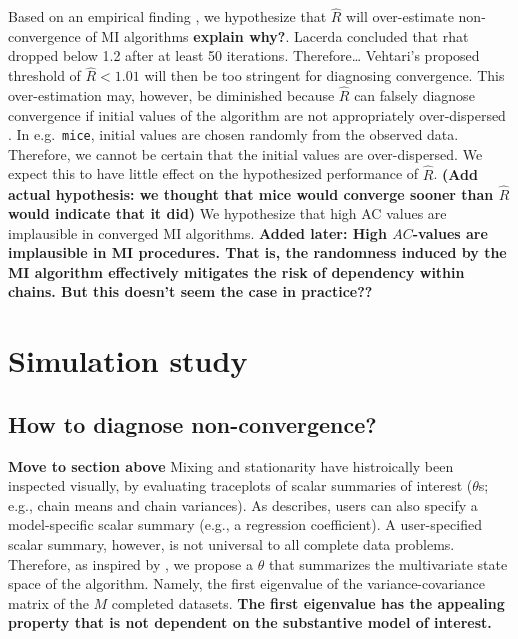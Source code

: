 \documentclass[Royal,times,sageh]{sagej}
\begin{document}
Based on an empirical finding \citep{lace07}, we hypothesize that
\(\widehat{R}\) will over-estimate non-convergence of MI algorithms
\textbf{explain why?}. Lacerda concluded that rhat dropped below 1.2
after at least 50 iterations. Therefore\ldots{} Vehtari's proposed
threshold of \(\widehat{R} < 1.01\) will then be too stringent for
diagnosing convergence. This over-estimation may, however, be diminished
because \(\widehat{R}\) can falsely diagnose convergence if initial
values of the algorithm are not appropriately over-dispersed
\citep[p.~437]{broo98}. In e.g.~\texttt{mice}, initial values are chosen
randomly from the observed data. Therefore, we cannot be certain that
the initial values are over-dispersed. We expect this to have little
effect on the hypothesized performance of \(\widehat{R}\). \textbf{(Add
actual hypothesis: we thought that mice would converge sooner than
\(\widehat{R}\) would indicate that it did)} We hypothesize that high AC
values are implausible in converged MI algorithms. \textbf{Added later:
High \(AC\)-values are implausible in MI procedures. That is, the
randomness induced by the MI algorithm effectively mitigates the risk of
dependency within chains. But this doesn't seem the case in practice??}

\hypertarget{simulation-study}{%
\section{Simulation study}\label{simulation-study}}

\hypertarget{how-to-diagnose-non-convergence}{%
\subsection{How to diagnose
non-convergence?}\label{how-to-diagnose-non-convergence}}

\textbf{Move to section above} Mixing and stationarity have histroically
been inspected visually, by evaluating traceplots of scalar summaries of
interest (\(\theta\)s; e.g., chain means and chain variances). As
\citet{buur18} describes, users can also specify a model-specific scalar
summary (e.g., a regression coefficient). A user-specified scalar
summary, however, is not universal to all complete data problems.
Therefore, as inspired by \citep{mack03}, we propose a \(\theta\) that
summarizes the multivariate state space of the algorithm. Namely, the
first eigenvalue of the variance-covariance matrix of the \(M\)
completed datasets. \textbf{The first eigenvalue has the appealing
property that is not dependent on the substantive model of interest.}
\end{document}
